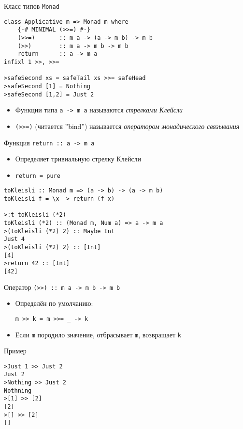 \documentclass{beamer}
\newcommand{\hs}[1]{\texttt{#1}}
\begin{document}
  \begin{frame}[fragile]{Класс типов \texttt{Monad}}
      \begin{verbatim}
class Applicative m => Monad m where
    {-# MINIMAL (>>=) #-}
    (>>=)       :: m a -> (a -> m b) -> m b
    (>>)        :: m a -> m b -> m b
    return      :: a -> m a
infixl 1 >>, >>=
    
>safeSecond xs = safeTail xs >>= safeHead
>safeSecond [1] = Nothing
>safeSecond [1,2] = Just 2
      \end{verbatim}
      \begin{itemize}
          \item Функции типа \hs{a -> m a} называются \textit{стрелками Клейсли}
          \item \hs{(>>=)} (читается ''bind'') называется \textit{оператором монадического связывания}
      \end{itemize}
  \end{frame}
  \begin{frame}[fragile]{Функция \texttt{return :: a -> m a}}
      \begin{itemize}
          \item Определяет тривиальную стрелку Клейсли
          \item \hs{return = pure}
      \end{itemize}
      \begin{verbatim}
toKleisli :: Monad m => (a -> b) -> (a -> m b)
toKleisli f = \x -> return (f x)

>:t toKleisli (*2)
toKleisli (*2) :: (Monad m, Num a) => a -> m a
>(toKleisli (*2) 2) :: Maybe Int
Just 4
>(toKleisli (*2) 2) :: [Int]
[4]
>return 42 :: [Int]
[42]
      \end{verbatim}
  \end{frame}
  \begin{frame}[fragile]{Оператор \texttt{(>{}>) :: m a -> m b -> m b}}
      \begin{itemize}
          \item Определён по умолчанию:
           
           \hs{m >> k = m >>= \_ -> k}
           \item Если \hs{m} породило значение, отбрасывает \hs{m}, возвращает \hs{k}
      \end{itemize}
      \begin{block}{Пример}
      \begin{verbatim}
>Just 1 >> Just 2
Just 2
>Nothing >> Just 2
Nothning
>[1] >> [2]
[2]
>[] >> [2]
[]
      \end{verbatim}
      \end{block}
  \end{frame}
\end{document}
